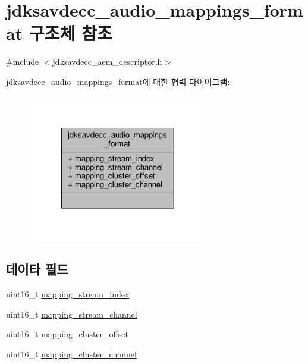 \hypertarget{structjdksavdecc__audio__mappings__format}{}\section{jdksavdecc\+\_\+audio\+\_\+mappings\+\_\+format 구조체 참조}
\label{structjdksavdecc__audio__mappings__format}


{\ttfamily \#include $<$jdksavdecc\+\_\+aem\+\_\+descriptor.\+h$>$}



jdksavdecc\+\_\+audio\+\_\+mappings\+\_\+format에 대한 협력 다이어그램\+:
\nopagebreak
\begin{figure}[H]
\begin{center}
\leavevmode
\includegraphics[width=222pt]{structjdksavdecc__audio__mappings__format__coll__graph}
\end{center}
\end{figure}
\subsection*{데이타 필드}
\begin{DoxyCompactItemize}
\item 
uint16\+\_\+t \hyperlink{structjdksavdecc__audio__mappings__format_ae776f05f1f60f83a69c154844271ca4a}{mapping\+\_\+stream\+\_\+index}
\item 
uint16\+\_\+t \hyperlink{structjdksavdecc__audio__mappings__format_a82e8b562c8e2249f302ed80fc1debadf}{mapping\+\_\+stream\+\_\+channel}
\item 
uint16\+\_\+t \hyperlink{structjdksavdecc__audio__mappings__format_ab57e85d38dacb8e4e841cf9f1fbd7a36}{mapping\+\_\+cluster\+\_\+offset}
\item 
uint16\+\_\+t \hyperlink{structjdksavdecc__audio__mappings__format_af42f86d0c0e308d654bb9519455c7e26}{mapping\+\_\+cluster\+\_\+channel}
\end{DoxyCompactItemize}


